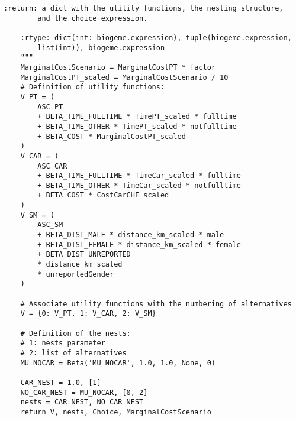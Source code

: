 \documentclass[12pt,a4paper]{article}
\begin{document}
\begin{lstlisting}[style=numbers]
    :return: a dict with the utility functions, the nesting structure,
        and the choice expression.

    :rtype: dict(int: biogeme.expression), tuple(biogeme.expression,
        list(int)), biogeme.expression
    """
    MarginalCostScenario = MarginalCostPT * factor
    MarginalCostPT_scaled = MarginalCostScenario / 10
    # Definition of utility functions:
    V_PT = (
        ASC_PT
        + BETA_TIME_FULLTIME * TimePT_scaled * fulltime
        + BETA_TIME_OTHER * TimePT_scaled * notfulltime
        + BETA_COST * MarginalCostPT_scaled
    )
    V_CAR = (
        ASC_CAR
        + BETA_TIME_FULLTIME * TimeCar_scaled * fulltime
        + BETA_TIME_OTHER * TimeCar_scaled * notfulltime
        + BETA_COST * CostCarCHF_scaled
    )
    V_SM = (
        ASC_SM
        + BETA_DIST_MALE * distance_km_scaled * male
        + BETA_DIST_FEMALE * distance_km_scaled * female
        + BETA_DIST_UNREPORTED
        * distance_km_scaled
        * unreportedGender
    )

    # Associate utility functions with the numbering of alternatives
    V = {0: V_PT, 1: V_CAR, 2: V_SM}

    # Definition of the nests:
    # 1: nests parameter
    # 2: list of alternatives
    MU_NOCAR = Beta('MU_NOCAR', 1.0, 1.0, None, 0)

    CAR_NEST = 1.0, [1]
    NO_CAR_NEST = MU_NOCAR, [0, 2]
    nests = CAR_NEST, NO_CAR_NEST
    return V, nests, Choice, MarginalCostScenario
\end{lstlisting}
\end{document}
